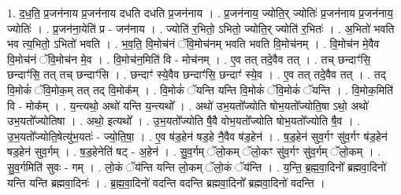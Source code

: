 \documentclass[17pt]{extarticle}
\begin{document}
1. द॒ध॒ति॒ प्र॒जन॑नाय प्र॒जन॑नाय दधति दधति प्र॒जन॑नाय । . प्र॒जन॑नाय॒ ज्योति॒र् ज्योतिः॑ प्र॒जन॑नाय प्र॒जन॑नाय॒ ज्योतिः॑ । . प्र॒जन॑ना॒येति॑ प्र - जन॑नाय । . ज्योति॑ र॒भितो॒ ऽभितो॒ ज्योति॒र् ज्योति॑ र॒भितः॑ । . अ॒भितो॑ भवति भव त्य॒भितो॒ ऽभितो॑ भवति । . भ॒व॒ति॒ वि॒मोच॑नं ॅवि॒मोच॑नम् भवति भवति वि॒मोच॑नम् । . वि॒मोच॑न मे॒वैव वि॒मोच॑नं ॅवि॒मोच॑न मे॒व । . वि॒मोच॑न॒मिति॑ वि - मोच॑नम् । . ए॒व तत् तदे॒वैव तत् । . तच् छन्दाꣳ॑सि॒ छन्दाꣳ॑सि॒ तत् तच् छन्दाꣳ॑सि । . छन्दाꣳ॑ स्ये॒वैव छन्दाꣳ॑सि॒ छन्दाꣳ॑ स्ये॒व । . ए॒व तत् तदे॒वैव तत् । . तद् वि॒मोकं॑ ॅवि॒मोक॒म् तत् तद् वि॒मोक᳚म् । . वि॒मोकं॑ ॅयन्ति यन्ति वि॒मोकं॑ ॅवि॒मोकं॑ ॅयन्ति । . वि॒मोक॒मिति॑ वि - मोक᳚म् । . य॒न्त्यथो॒ अथो॑ यन्ति य॒न्त्यथो᳚ । . अथो॑ उभ॒यतो᳚ज्योति षोभ॒यतो᳚ज्योति॒षा ऽथो॒ अथो॑ उभ॒यतो᳚ज्योतिषा । . अथो॒ इत्यथो᳚ । . उ॒भ॒यतो᳚ज्योति षै॒वै वोभ॒यतो᳚ज्योति षोभ॒यतो᳚ज्योति षै॒व । . उ॒भ॒यतो᳚ज्योति॒षेत्यु॑भ॒यतः॑ - ज्यो॒ति॒षा॒ । . ए॒व ष॑ड॒हेन॑ षड॒हे नै॒वैव ष॑ड॒हेन॑ । . ष॒ड॒हेन॑ सुव॒र्गꣳ सु॑व॒र्गꣳ ष॑ड॒हेन॑ षड॒हेन॑ सुव॒र्गम् । . ष॒ड॒हेनेति॑ षट् - अ॒हेन॑ । . सु॒व॒र्गम् ॅलो॒कम् ॅलो॒कꣳ सु॑व॒र्गꣳ सु॑व॒र्गम् ॅलो॒कम् । . सु॒व॒र्गमिति॑ सुवः - गम् । . लो॒कं ॅय॑न्ति यन्ति लो॒कम् ॅलो॒कं ॅय॑न्ति । . य॒न्ति॒ ब्र॒ह्म॒वा॒दिनो᳚ ब्रह्मवा॒दिनो॑ यन्ति यन्ति ब्रह्मवा॒दिनः॑ । . ब्र॒ह्म॒वा॒दिनो॑ वदन्ति वदन्ति ब्रह्मवा॒दिनो᳚ ब्रह्मवा॒दिनो॑ वदन्ति । \newline
\end{document}
